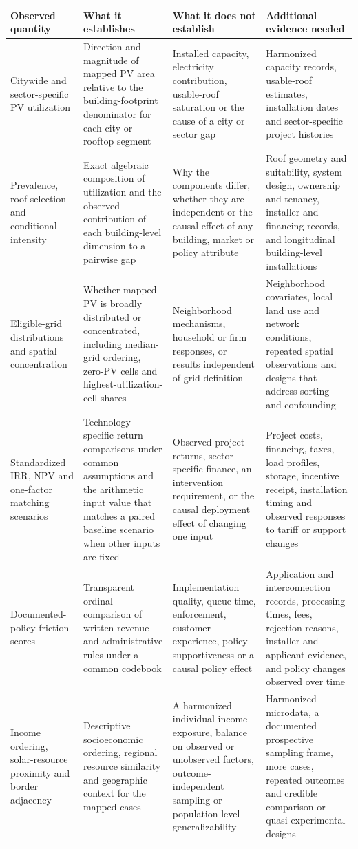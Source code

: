 \begin{tabular}{@{}>{\raggedright\arraybackslash}p{3.1cm}>{\raggedright\arraybackslash}p{3.8cm}>{\raggedright\arraybackslash}p{4.2cm}>{\raggedright\arraybackslash}p{4.2cm}@{}}
\toprule
Observed quantity & What it establishes & What it does not establish & Additional evidence needed \\
\midrule
Citywide and sector-specific PV utilization & Direction and magnitude of mapped PV area relative to the building-footprint denominator for each city or rooftop segment & Installed capacity, electricity contribution, usable-roof saturation or the cause of a city or sector gap & Harmonized capacity records, usable-roof estimates, installation dates and sector-specific project histories \\
Prevalence, roof selection and conditional intensity & Exact algebraic composition of utilization and the observed contribution of each building-level dimension to a pairwise gap & Why the components differ, whether they are independent or the causal effect of any building, market or policy attribute & Roof geometry and suitability, system design, ownership and tenancy, installer and financing records, and longitudinal building-level installations \\
Eligible-grid distributions and spatial concentration & Whether mapped PV is broadly distributed or concentrated, including median-grid ordering, zero-PV cells and highest-utilization-cell shares & Neighborhood mechanisms, household or firm responses, or results independent of grid definition & Neighborhood covariates, local land use and network conditions, repeated spatial observations and designs that address sorting and confounding \\
Standardized IRR, NPV and one-factor matching scenarios & Technology-specific return comparisons under common assumptions and the arithmetic input value that matches a paired baseline scenario when other inputs are fixed & Observed project returns, sector-specific finance, an intervention requirement, or the causal deployment effect of changing one input & Project costs, financing, taxes, load profiles, storage, incentive receipt, installation timing and observed responses to tariff or support changes \\
Documented-policy friction scores & Transparent ordinal comparison of written revenue and administrative rules under a common codebook & Implementation quality, queue time, enforcement, customer experience, policy supportiveness or a causal policy effect & Application and interconnection records, processing times, fees, rejection reasons, installer and applicant evidence, and policy changes observed over time \\
Income ordering, solar-resource proximity and border adjacency & Descriptive socioeconomic ordering, regional resource similarity and geographic context for the mapped cases & A harmonized individual-income exposure, balance on observed or unobserved factors, outcome-independent sampling or population-level generalizability & Harmonized microdata, a documented prospective sampling frame, more cases, repeated outcomes and credible comparison or quasi-experimental designs \\
\bottomrule
\end{tabular}
